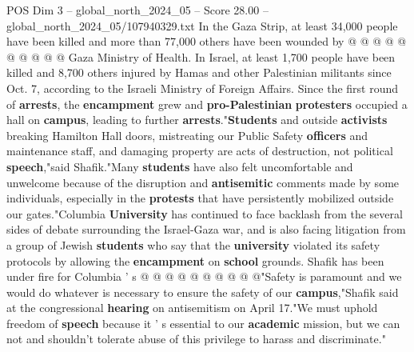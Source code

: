 \begin{textsample}{POS Dim 3 – global\_north\_2024\_05 – Score 28.00 – global\_north\_2024\_05/107940329.txt}
In the Gaza Strip, at least 34,000 people have been killed and more than 77,000 others have been wounded by @ @ @ @ @ @ @ @ @ @ Gaza Ministry of Health.
In Israel, at least 1,700 people have been killed and 8,700 others injured by Hamas and other Palestinian militants since Oct. 7, according to the Israeli Ministry of Foreign Affairs.
Since the first round of \textbf{arrests}, the \textbf{encampment} grew and \textbf{pro-Palestinian} \textbf{protesters} occupied a hall on \textbf{campus}, leading to further \textbf{arrests}."\textbf{Students} and outside \textbf{activists} breaking Hamilton Hall doors, mistreating our Public Safety \textbf{officers} and maintenance staff, and damaging property are acts of destruction, not political \textbf{speech},"said Shafik."Many \textbf{students} have also felt uncomfortable and unwelcome because of the disruption and \textbf{antisemitic} comments made by some individuals, especially in the \textbf{protests} that have persistently mobilized outside our gates."Columbia \textbf{University} has continued to face backlash from the several sides of debate surrounding the Israel-Gaza war, and is also facing litigation from a group of Jewish \textbf{students} who say that the \textbf{university} violated its safety protocols by allowing the \textbf{encampment} on \textbf{school} grounds.
Shafik has been under fire for Columbia ' s @ @ @ @ @ @ @ @ @ @"Safety is paramount and we would do whatever is necessary to ensure the safety of our \textbf{campus},"Shafik said at the congressional \textbf{hearing} on antisemitism on April 17."We must uphold freedom of \textbf{speech} because it ' s essential to our \textbf{academic} mission, but we can not and shouldn't tolerate abuse of this privilege to harass and discriminate."

\end{textsample}

